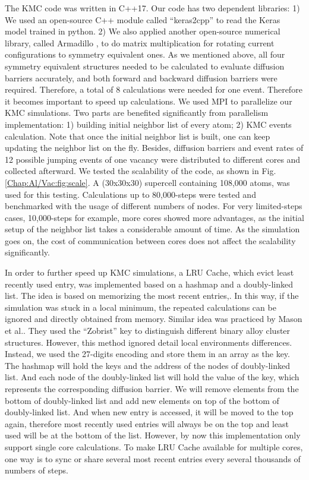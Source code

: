 The \ac{KMC} code was written in C++17. \cite{Zhang2020KNN2} Our code has two dependent libraries: 1) We used an open-source C++ module called ``keras2cpp'' to read the Keras model trained in python. \cite{Perevozchikov2019} 2) We also applied another open-source numerical library, called Armadillo \cite{sanderson2016armadillo, sanderson2018user}, to do matrix multiplication for rotating current configurations to symmetry equivalent ones. As we mentioned above, all four symmetry equivalent structures needed to be calculated to evaluate diffusion barriers accurately, and both forward and backward diffusion barriers were required. Therefore, a total of 8 calculations were needed for one event. Therefore it becomes important to speed up calculations. We used \ac{MPI} to parallelize our \ac{KMC} simulations. Two parts are benefited significantly from parallelism implementation: 1) building initial neighbor list of every atom; 2) \ac{KMC} events calculation. Note that once the initial neighbor list is built, one can keep updating the neighbor list on the fly. Besides, diffusion barriers and event rates of 12 possible jumping events of one vacancy were distributed to different cores and collected afterward. We tested the scalability of the code, as shown in Fig. \ref{Chap:Al/Vac:fig:scale}. A (30x30x30) supercell containing 108,000 atoms, was used for this testing. Calculations up to 80,000-steps were tested and benchmarked with the usage of different numbers of nodes. For very limited-steps cases, 10,000-steps for example, more cores showed more advantages, as the initial setup of the neighbor list takes a considerable amount of time. As the simulation goes on, the cost of communication between cores does not affect the scalability significantly.


In order to further speed up \ac{KMC} simulations, a \acf{LRU} Cache, which evict least recently used entry, was implemented based on a hashmap and a  doubly-linked list. The idea is based on memorizing the most recent entries,. In this way, if the simulation was stuck in a local minimum, the repeated calculations can be ignored and directly obtained from memory. Similar idea was practiced by Mason et al.\cite{mason2005fast}. They used the ``Zobrist'' key to distinguish different binary alloy cluster structures. However, this method ignored detail local environments differences. Instead, we used the 27-digits encoding and store them in an array as the key. The hashmap will hold the keys and the address of the nodes of doubly-linked list. And each node of the doubly-linked list will hold the value of the key, which represents the corresponding diffusion barrier. We will remove elements from the bottom of doubly-linked list and add new elements on top of the bottom of doubly-linked list. And when new entry is accessed, it will be moved to the top again, therefore most recently used entries will always be on the top and least used will be at the bottom of the list. However, by now this implementation only support single core calculations. To make \ac{LRU} Cache available for multiple cores, one way is to sync or share several most recent entries every several thousands of numbers of steps.


